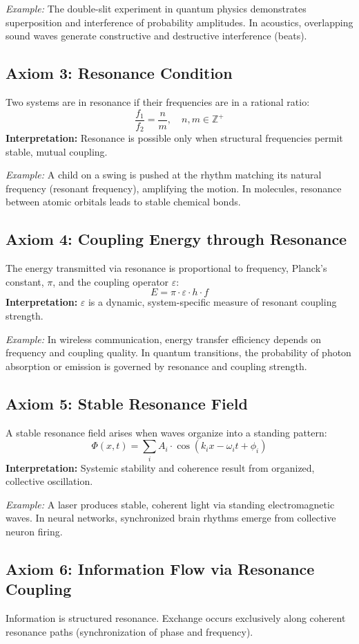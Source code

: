 \documentclass[12pt]{iopart}
\begin{document}
\textit{Example:} The double-slit experiment in quantum physics demonstrates superposition and interference of probability amplitudes. In acoustics, overlapping sound waves generate constructive and destructive interference (beats).

\subsection{Axiom 3: Resonance Condition}
Two systems are in resonance if their frequencies are in a rational ratio:
\[
\frac{f_1}{f_2} = \frac{n}{m},\quad n, m \in \mathbb{Z}^+
\]
\textbf{Interpretation:} Resonance is possible only when structural frequencies permit stable, mutual coupling.

\textit{Example:} A child on a swing is pushed at the rhythm matching its natural frequency (resonant frequency), amplifying the motion. In molecules, resonance between atomic orbitals leads to stable chemical bonds.

\subsection{Axiom 4: Coupling Energy through Resonance}
The energy transmitted via resonance is proportional to frequency, Planck's constant, $\pi$, and the coupling operator $\varepsilon$:
\[
E = \pi \cdot \varepsilon \cdot h \cdot f
\]
\textbf{Interpretation:} $\varepsilon$ is a dynamic, system-specific measure of resonant coupling strength.

\textit{Example:} In wireless communication, energy transfer efficiency depends on frequency and coupling quality. In quantum transitions, the probability of photon absorption or emission is governed by resonance and coupling strength.

\subsection{Axiom 5: Stable Resonance Field}
A stable resonance field arises when waves organize into a standing pattern:
\[
\Phi(x, t) = \sum_{i} A_i \cdot \cos(k_i x - \omega_i t + \phi_i)
\]
\textbf{Interpretation:} Systemic stability and coherence result from organized, collective oscillation.

\textit{Example:} A laser produces stable, coherent light via standing electromagnetic waves. In neural networks, synchronized brain rhythms emerge from collective neuron firing.

\subsection{Axiom 6: Information Flow via Resonance Coupling}
Information is structured resonance. Exchange occurs exclusively along coherent resonance paths (synchronization of phase and frequency).
\end{document}
